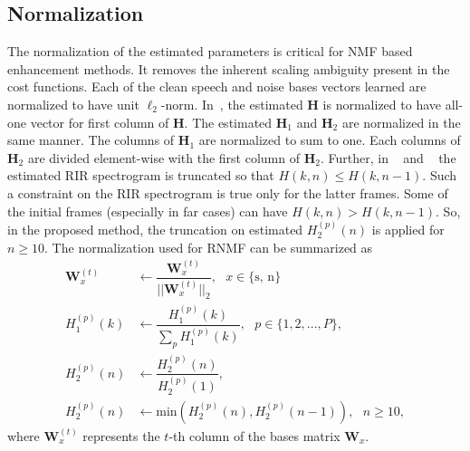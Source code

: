 \subsection{Normalization}
\label{sec:normaization}
The normalization of the estimated parameters is critical for NMF based enhancement methods. It removes the inherent scaling ambiguity present in the cost functions. Each of the clean speech and noise bases vectors learned are normalized to have unit $\ell_2$-norm. 
In~\cite{mohammadiha2016speech}, the estimated $\mathbf{H}$ is normalized to have all-one vector for first column of $\mathbf{H}$. The estimated $\mathbf{H}_1$ and $\mathbf{H}_2$ are normalized in the same manner. The columns of $\mathbf{H}_1$ are normalized to sum to one. Each columns of $\mathbf{H}_2$ are divided element-wise with the first column of $\mathbf{H}_2$. Further, in ~\cite{mohammadiha2016speech} and ~\cite{baby2015coupled} the estimated RIR spectrogram is truncated so that $H(k,n) \leq H(k,n-1)$. Such a constraint on the RIR spectrogram is true only for the latter frames. Some of the initial frames (especially in far cases) can have $H(k,n) > H(k,n-1)$. So, in the proposed method, the truncation on estimated $H_2^{(p)}(n)$ is applied for $n\geq10$.
The normalization used for RNMF can be summarized as
\begin{align}
\mathbf{W}_x^{(t)} &\leftarrow \dfrac{\mathbf{W}_x^{(t)}}{|| \mathbf{W}_x^{(t)}||_2}, \text{     } x\in\{\text{s, n}\}\nonumber\\
H_1^{(p)}(k) &\leftarrow \dfrac{H_1^{(p)}(k)}{ \sum_p H^{(p)}_1(k)}, \text{   }p\in \{1,2,...,P\},\nonumber\\
H_2^{(p)}(n) &\leftarrow \dfrac{H_2^{(p)}(n)}{H^{(p)}_2(1)}, \nonumber\\
H_2^{(p)}(n) &\leftarrow \text{min}(H_2^{(p)}(n), H_2^{(p)}(n-1)), \text{ } n\geq10,
\label{eq:normalizations}
\end{align}    
where $\mathbf{W}_x^{(t)}$ represents the $t$-th column of the bases matrix $\mathbf{W}_x$.

